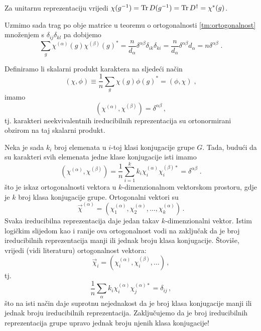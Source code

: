 Za unitarnu reprezentaciju vrijedi $\chi(g^{-1}) = \operatorname{Tr} D(g^{-1})= \operatorname{Tr} D^{\dagger}
    = \chi^{*}(g)$.


Uzmimo sada trag po obje matrice
u teoremu o ortogonalnosti \ref{tm:ortogonalnost} množenjem
s $\delta_{ij}\delta_{kl}$ pa dobijemo
\begin{displaymath}
\sum_g \chi^{(\alpha)}(g) \chi^{(\beta)}(g)^* = 
\frac{n}{d_{\alpha}} \delta^{\alpha\beta} \delta_{ik}\delta_{ki} =
\frac{n}{d_{\alpha}} \delta^{\alpha\beta} d_{\alpha} =
n \delta^{\alpha\beta} \;.
\end{displaymath}

Definiramo li skalarni produkt karaktera na sljedeći način
 \begin{displaymath}
(\chi, \phi) \equiv \frac{1}{n} \sum_g \chi(g) \phi(g)^* = (\phi, \chi) \;,
\end{displaymath}
imamo
\begin{displaymath}
(\chi^{(\alpha)}, \chi^{(\beta)}) = \delta^{\alpha\beta} \,,
\end{displaymath}
tj. karakteri neekvivalentnih ireducibilnih reprezentacija su ortonormirani
obzirom na taj skalarni produkt.

Neka je sada $k_i$ broj elemenata u $i$-toj klasi konjugacije grupe $G$.
Tada, budući da su karakteri svih elemenata jedne klase konjugacije
isti imamo
\begin{displaymath}
(\chi^{(\alpha)}, \chi^{(\beta)})=\frac{1}{n} \sum_{i=1}^{k}  k_i
 \chi^{(\alpha)}_i \chi^{(\beta)*}_{i} = \delta^{\alpha\beta} \;.
\end{displaymath}
što je iskaz ortogonalnosti vektora u $k$-dimenzionalnom vektorskom
prostoru, gdje je $k$ broj klasa konjugacije grupe. Ortogonalni vektori su
\begin{displaymath}
\vec{\chi}^{(\alpha)} = (\chi^{(\alpha)}_1, \chi^{(\alpha)}_2, \ldots,
 \chi^{(\alpha)}_{k}) \,.
\end{displaymath}
Svaka ireducibilna reprezentacija daje jedan takav $k$-dimenzionalni vektor.
Istim logičkim slijedom kao i ranije ova ortogonalnost vodi na zaključak 
da je broj
ireducibilnih reprezentacija  manji ili jednak broju klasa konjugacije. Štoviše, vrijedi
(vidi literaturu) ortogonalnost vektora:
\begin{displaymath}
\vec{\chi}_i = (\chi^{(\alpha)}_i, \chi^{(\beta)}_i, \ldots) \,,
\end{displaymath}
tj.
\begin{displaymath}
\frac{1}{n} \sum_{\alpha} k_i \chi^{(\alpha)}_i \chi^{(\alpha)*}_j =
\delta_{ij} \,,
\end{displaymath}
što na isti način daje suprotnu nejednakost da je broj klasa konjugacije manji
ili jednak broju ireducibilnih reprezentacija.
Zaključujemo da je broj ireducibilnih reprezentacija grupe 
upravo jednak broju njenih klasa konjugacije!

